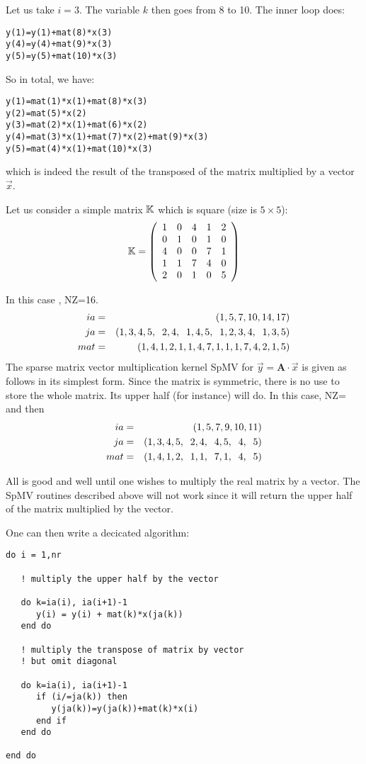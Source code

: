 Let us take $i=3$. The variable $k$ then goes from 8 to 10. 
The inner loop does:
\begin{verbatim}
y(1)=y(1)+mat(8)*x(3)
y(4)=y(4)+mat(9)*x(3)
y(5)=y(5)+mat(10)*x(3)
\end{verbatim}

So in total, we have:
\begin{verbatim}
y(1)=mat(1)*x(1)+mat(8)*x(3)
y(2)=mat(5)*x(2)
y(3)=mat(2)*x(1)+mat(6)*x(2)
y(4)=mat(3)*x(1)+mat(7)*x(2)+mat(9)*x(3)
y(5)=mat(4)*x(1)+mat(10)*x(3)
\end{verbatim}
which is indeed the result of the transposed of the matrix multiplied by a vector $\vec{x}$.

\vspace{0.6cm}

Let us consider a simple matrix ${\mathbb{K}}$ which is square (size is $5\times5$):
\[
{\mathbb{K}}=
\left(
\begin{array}{ccccc}
1&0&4&1&2\\
0&1&0&1&0\\
4&0&0&7&1\\
1&1&7&4&0\\
2&0&1&0&5
\end{array}
\right)
\]

In this case , NZ=16.
\begin{eqnarray}
ia &=&(1,5,7,10,14,17) \nonumber\\
ja &=&(1,3,4,5,\;\; 2,4, \;\; 1,4,5, \;\; 1,2,3,4, \;\; 1,3,5) \nonumber\\
mat&=&(1,4,1,2,1,1,4,7,1,1,1,7,4,2,1,5) \nonumber
\end{eqnarray}
The sparse matrix vector multiplication kernel SpMV for $\vec{y} = {\bm A}\cdot \vec{x}$ 
is given  as follows in its simplest form.
Since the matrix is symmetric, there is no use to store the whole matrix. Its upper half (for instance) will do. 
In this case, NZ=
and then 
\begin{eqnarray}
ia &=&(1,5,7,9,10,11) \nonumber\\
ja &=&(1,3,4,5,\;\; 2,4, \;\; 4,5, \;\; 4, \;\; 5) \nonumber\\
mat&=&(1,4,1,2,\;\; 1,1, \;\; 7,1, \;\; 4,\;\; 5) \nonumber
\end{eqnarray}

All is good and well until one wishes to multiply the real matrix by a vector. 
The SpMV routines described above will not work since it will return the upper half of the matrix 
multiplied by the vector.

One can then write a decicated algorithm:
\begin{verbatim}
do i = 1,nr

   ! multiply the upper half by the vector

   do k=ia(i), ia(i+1)-1
      y(i) = y(i) + mat(k)*x(ja(k))
   end do

   ! multiply the transpose of matrix by vector
   ! but omit diagonal 

   do k=ia(i), ia(i+1)-1
      if (i/=ja(k)) then
         y(ja(k))=y(ja(k))+mat(k)*x(i)
      end if
   end do

end do
\end{verbatim}


